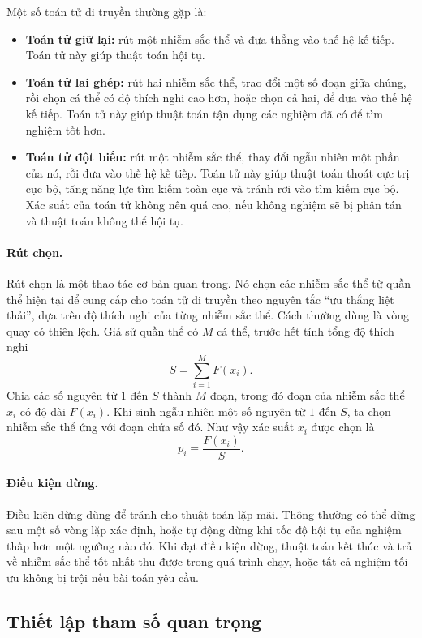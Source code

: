 \documentclass[11pt]{article}
\begin{document}
Một số toán tử di truyền thường gặp là:
\begin{itemize}
  \item \textbf{Toán tử giữ lại:} rút một nhiễm sắc thể và đưa thẳng vào thế
  hệ kế tiếp. Toán tử này giúp thuật toán hội tụ.
  \item \textbf{Toán tử lai ghép:} rút hai nhiễm sắc thể, trao đổi một số đoạn
  giữa chúng, rồi chọn cá thể có độ thích nghi cao hơn, hoặc chọn cả hai, để
  đưa vào thế hệ kế tiếp. Toán tử này giúp thuật toán tận dụng các nghiệm đã
  có để tìm nghiệm tốt hơn.
  \item \textbf{Toán tử đột biến:} rút một nhiễm sắc thể, thay đổi ngẫu nhiên
  một phần của nó, rồi đưa vào thế hệ kế tiếp. Toán tử này giúp thuật toán
  thoát cực trị cục bộ, tăng năng lực tìm kiếm toàn cục và tránh rơi vào tìm
  kiếm cục bộ. Xác suất của toán tử không nên quá cao, nếu không nghiệm sẽ bị
  phân tán và thuật toán không thể hội tụ.
\end{itemize}

\paragraph{Rút chọn.}
Rút chọn là một thao tác cơ bản quan trọng. Nó chọn các nhiễm sắc thể từ quần
thể hiện tại để cung cấp cho toán tử di truyền theo nguyên tắc ``ưu thắng liệt
thải'', dựa trên độ thích nghi của từng nhiễm sắc thể. Cách thường dùng là
vòng quay có thiên lệch. Giả sử quần thể có \(M\) cá thể, trước hết tính tổng
độ thích nghi
\[
  S=\sum_{i=1}^{M} F(x_i).
\]
Chia các số nguyên từ \(1\) đến \(S\) thành \(M\) đoạn, trong đó đoạn của nhiễm
sắc thể \(x_i\) có độ dài \(F(x_i)\). Khi sinh ngẫu nhiên một số nguyên từ
\(1\) đến \(S\), ta chọn nhiễm sắc thể ứng với đoạn chứa số đó. Như vậy xác
suất \(x_i\) được chọn là
\[
  p_i=\frac{F(x_i)}{S}.
\]

\paragraph{Điều kiện dừng.}
Điều kiện dừng dùng để tránh cho thuật toán lặp mãi. Thông thường có thể dừng
sau một số vòng lặp xác định, hoặc tự động dừng khi tốc độ hội tụ của nghiệm
thấp hơn một ngưỡng nào đó. Khi đạt điều kiện dừng, thuật toán kết thúc và trả
về nhiễm sắc thể tốt nhất thu được trong quá trình chạy, hoặc tất cả nghiệm
tối ưu không bị trội nếu bài toán yêu cầu.

\subsection{Thiết lập tham số quan trọng}
\end{document}
